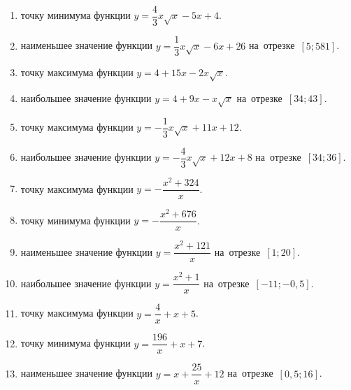 \documentclass[a4paper,10pt]{article}
\begin{document}
\begin{enumerate}
\item {} точку минимума функции $y=\dfrac{4}{3}x\sqrt{x} -5x+4$.

\item {} наименьшее значение функции $y=\dfrac{1}{3}x\sqrt{x} -6x+26$ на~отрезке~$\left[5;581\right]$.

\item {} точку максимума функции $y=4+15x -2x\sqrt{x}$.

\item {} наибольшее значение функции $y=4+9x -x\sqrt{x}$ на~отрезке~$\left[34;43\right]$.

\item {} точку максимума функции $y=-\dfrac{1}{3}x\sqrt{x} +11x+12$.

\item {} наибольшее значение функции $y=-\dfrac{4}{3}x\sqrt{x} +12x+8$ на~отрезке~$\left[34;36\right]$.

\item {} точку максимума функции $y=-\dfrac{x^2 +324}{x}$.







\item {} точку минимума функции $y=-\dfrac{x^2 +676}{x}$.







\item {} наименьшее значение функции $y=\dfrac{x^2 +121}{x}$ на~отрезке~$\left[1;20\right]$.







\item {} наибольшее значение функции $y=\dfrac{x^2 +1}{x}$ на~отрезке~$\left[-11;-0,5\right]$.







\item {} точку максимума функции $y=\dfrac{4}{x} +x+5$.

\item {} точку минимума функции $y=\dfrac{196}{x} +x+7$.

\item {} наименьшее значение функции $y=x+\dfrac{25}{x} +12$ на~отрезке~$\left[0,5;16\right]$.


\end{enumerate}
\end{document}
